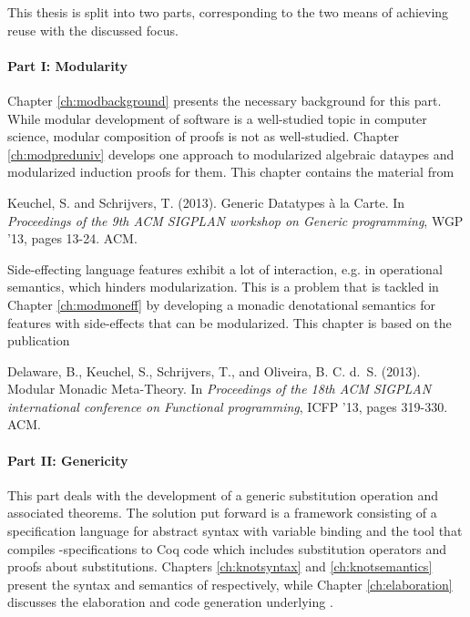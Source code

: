 {This thesis is split into two parts, corresponding to the two means of achieving
reuse with the discussed focus.

\paragraph{Part I: Modularity}

Chapter \ref{ch:modbackground} presents the necessary background for this
part. While modular development of software is a well-studied topic in computer
science, modular composition of proofs is not as well-studied. Chapter
\ref{ch:modpreduniv} develops one approach to modularized algebraic dataypes and
modularized induction proofs for them. This chapter contains the material from

\begin{center}
  \begin{minipage}{0.85\columnwidth}
    Keuchel, S. and Schrijvers, T. (2013).
    \newblock Generic Datatypes \`a la Carte.
    \newblock In {\em Proceedings of the 9th ACM SIGPLAN workshop on Generic
      programming}, WGP ’13, pages 13-24. ACM.
  \end{minipage}
\end{center}

Side-effecting language features exhibit a lot of interaction, e.g. in
operational semantics, which hinders modularization. This is a problem that is
tackled in Chapter \ref{ch:modmoneff} by developing a monadic denotational
semantics for features with side-effects that can be modularized. This chapter
is based on the publication

\begin{center}
  \begin{minipage}{0.85\columnwidth}
    Delaware, B., Keuchel, S., Schrijvers, T., and Oliveira,
    B. C. d.~S. (2013).
    \newblock Modular Monadic Meta-Theory.
    \newblock In {\em Proceedings of the 18th ACM SIGPLAN international
      conference on Functional programming}, ICFP '13, pages 319-330. ACM.
  \end{minipage}
\end{center}


\paragraph{Part II: Genericity}
This part deals with the development of a generic substitution operation and
associated theorems. The solution put forward is a framework consisting of a
specification language \Knot for abstract syntax with variable binding and the
tool \Needle that compiles \Knot-specifications to Coq code which includes
substitution operators and proofs about substitutions. Chapters
\ref{ch:knotsyntax} and \ref{ch:knotsemantics} present the syntax and semantics
of \Knot respectively, while Chapter \ref{ch:elaboration} discusses the
elaboration and code generation underlying \Needle.

}
